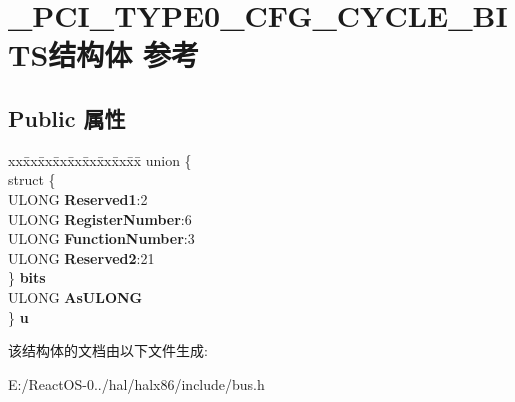 \hypertarget{struct___p_c_i___t_y_p_e0___c_f_g___c_y_c_l_e___b_i_t_s}{}\section{\+\_\+\+P\+C\+I\+\_\+\+T\+Y\+P\+E0\+\_\+\+C\+F\+G\+\_\+\+C\+Y\+C\+L\+E\+\_\+\+B\+I\+T\+S结构体 参考}
\label{struct___p_c_i___t_y_p_e0___c_f_g___c_y_c_l_e___b_i_t_s}
\subsection*{Public 属性}
\begin{DoxyCompactItemize}
\item 
\mbox{\label{struct___p_c_i___t_y_p_e0___c_f_g___c_y_c_l_e___b_i_t_s_a4cd17639f1a7661f96c2c0ebd5492425}} 
\begin{tabbing}
xx\=xx\=xx\=xx\=xx\=xx\=xx\=xx\=xx\=\kill
union \{\\
\>struct \{\\
\>\>ULONG {\bfseries Reserved1}:2\\
\>\>ULONG {\bfseries RegisterNumber}:6\\
\>\>ULONG {\bfseries FunctionNumber}:3\\
\>\>ULONG {\bfseries Reserved2}:21\\
\>\} {\bfseries bits}\\
\>ULONG {\bfseries AsULONG}\\
\} {\bfseries u}\\

\end{tabbing}\end{DoxyCompactItemize}


该结构体的文档由以下文件生成\+:\begin{DoxyCompactItemize}
\item 
E\+:/\+React\+O\+S-\/0../hal/halx86/include/bus.\+h\end{DoxyCompactItemize}
